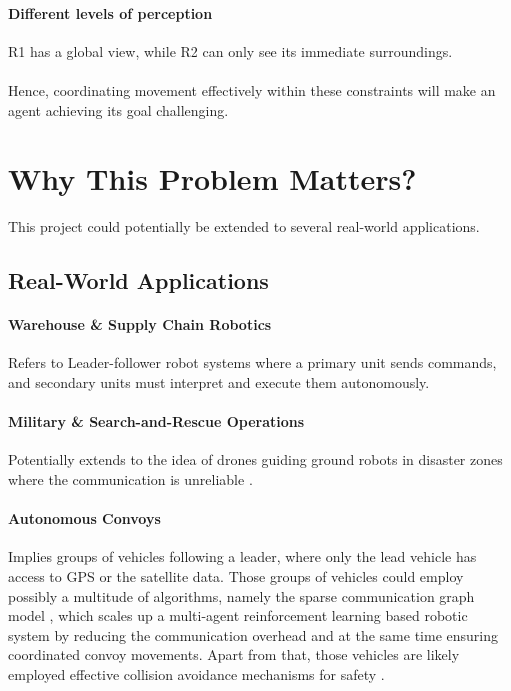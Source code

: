\documentclass[a4paper,11pt]{article}
\begin{document}
\paragraph{Different levels of perception} R1 has a global view, while R2 can only see its immediate surroundings. 

\paragraph{} Hence, coordinating movement effectively within these constraints will make an agent achieving its goal challenging. 


\section{Why This Problem Matters?}

This project could potentially be extended to several real-world applications. 

\subsection{Real-World Applications}

\paragraph{Warehouse \& Supply Chain Robotics \cite{swarm-RL-overview}} Refers to Leader-follower robot systems where a primary unit sends commands, and secondary units must interpret and execute them autonomously.

\paragraph{Military \& Search-and-Rescue Operations} Potentially extends to the idea of drones guiding ground robots in disaster zones where the communication is unreliable \cite{D-MARL}.

\paragraph{Autonomous Convoys \cite{MARL-coord-commun-control}} Implies groups of vehicles following a leader, where only the lead vehicle has access to GPS or the satellite data. Those groups of vehicles could employ possibly a multitude of algorithms, namely the sparse communication graph model \cite{scaling-MARL-adaptive-sparese-commun-graph}, which scales up a multi-agent reinforcement learning based robotic system by reducing the communication overhead and at the same time ensuring coordinated convoy movements. Apart from that, those vehicles are likely employed effective collision avoidance mechanisms for safety \cite{bio-collision-avoidance-swarm-deepRL}.
\end{document}
